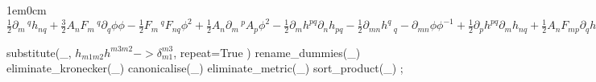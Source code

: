 \documentclass[12pt,a4paper,svgnames]{extarticle}
\begin{document}
\begin{adjustwidth}{1em}{0cm}${}\frac{1}{2}\partial_{m}\,^{q}{h_{n q}}+\frac{3}{2}A_{n} F_{m}\,^{q} \partial_{q}{\phi} \phi - \frac{1}{2}F_{m}\,^{q} F_{n q} {\phi}^{2}+\frac{1}{2}A_{n} \partial_{m}\,^{p}{A_{p}} {\phi}^{2} - \frac{1}{2}\partial_{m}{h^{p q}} \partial_{n}{h_{p q}} - \frac{1}{2}\partial_{m n}{h^{q}\,_{q}}-\partial_{m n}{\phi} {\phi}^{-1}+\frac{1}{2}\partial_{p}{h^{p q}} \partial_{m}{h_{n q}}+\frac{1}{2}A_{n} F_{m p} \partial_{q}{h^{p q}} {\phi}^{2}+\frac{1}{2}\partial_{n}{h_{m q}} \partial_{p}{h^{q p}}+\frac{1}{2}A_{m} F_{n p} \partial_{q}{h^{p q}} {\phi}^{2}+\frac{1}{2}\partial_{n}\,^{q}{h_{m q}}+\frac{3}{2}A_{m} F_{n}\,^{q} \partial_{q}{\phi} \phi+\frac{1}{2}A_{m} \partial_{n}\,^{p}{A_{p}} {\phi}^{2} - \frac{1}{2}\partial_{p}{h_{m n}} \partial_{q}{h^{p q}}-A_{m} A_{n} \partial_{p}{\phi} \partial_{q}{h^{p q}} \phi - \frac{1}{2}\partial^{q}\,_{q}{h_{m n}}-A_{m} A_{n} \partial^{q}\,_{q}{\phi} \phi - \frac{1}{2}A_{n} \partial^{q}\,_{q}{A_{m}} {\phi}^{2}%
 - \frac{1}{2}A_{m} \partial^{q}\,_{q}{A_{n}} {\phi}^{2} - \frac{1}{2}\partial^{s}{h_{m r}} \partial_{q}{h_{n s}} h^{r q}+\frac{1}{2}A_{n} F^{r}\,_{q} \partial_{r}{h_{m s}} {\phi}^{2} h^{q s}+\frac{1}{2}A_{m} F^{r}\,_{q} \partial_{r}{h_{n s}} {\phi}^{2} h^{q s}+\frac{1}{4}A_{m} A_{n} F^{r}\,_{q} F_{r s} {\phi}^{4} h^{q s}+\frac{1}{2}\partial^{q}{h_{m r}} \partial_{q}{h_{n s}} h^{r s} - \frac{1}{4}\partial_{m}{h^{r}\,_{q}} \partial_{n}{h_{r s}} h^{q s}+\frac{1}{4}\partial_{m}{h_{n}\,^{p}} \partial_{p}{h_{r s}} h^{r s}+\frac{1}{4}A_{n} F_{m}\,^{q} \partial_{q}{h_{r s}} {\phi}^{2} h^{r s}+\frac{1}{2}\partial^{q}{\phi} \partial_{m}{h_{n q}} {\phi}^{-1}+\frac{1}{4}\partial_{n}{h_{m}\,^{p}} \partial_{p}{h_{r s}} h^{r s}+\frac{1}{4}A_{m} F_{n}\,^{q} \partial_{q}{h_{r s}} {\phi}^{2} h^{r s}+\frac{1}{2}\partial^{q}{\phi} \partial_{n}{h_{m q}} {\phi}^{-1} - \frac{1}{4}\partial^{q}{h_{m n}} \partial_{q}{h_{r s}} h^{r s} - \frac{1}{2}A_{m} A_{n} \partial^{q}{\phi} \partial_{q}{h_{r s}} \phi h^{r s} - \frac{1}{2}\partial^{q}{\phi} \partial_{q}{h_{m n}} {\phi}^{-1}$\end{adjustwidth}
\begin{python}
substitute(_, $h_{m1 m2} h^{m3 m2} -> \delta_{m1}^{m3}$, repeat=True )
rename_dummies(_)
eliminate_kronecker(_)
canonicalise(_)
eliminate_metric(_)
sort_product(_)
;
\end{python}
\end{document}

